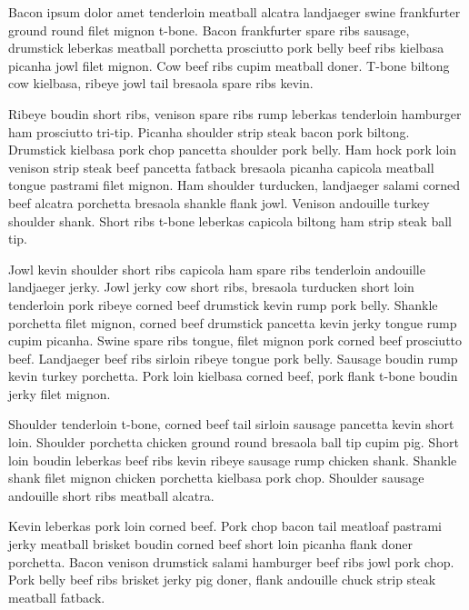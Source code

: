 \documentclass[11pt, a4paper]{article} %
\begin{document}
%	

Bacon ipsum dolor amet tenderloin meatball alcatra landjaeger swine frankfurter ground round filet mignon t-bone. Bacon frankfurter spare ribs sausage, drumstick leberkas meatball porchetta prosciutto pork belly beef ribs kielbasa picanha jowl filet mignon. Cow beef ribs cupim meatball doner. T-bone biltong cow kielbasa, ribeye jowl tail bresaola spare ribs kevin.

Ribeye boudin short ribs, venison spare ribs rump leberkas tenderloin hamburger ham prosciutto tri-tip. Picanha shoulder strip steak bacon pork biltong. Drumstick kielbasa pork chop pancetta shoulder pork belly. Ham hock pork loin venison strip steak beef pancetta fatback bresaola picanha capicola meatball tongue pastrami filet mignon. Ham shoulder turducken, landjaeger salami corned beef alcatra porchetta bresaola shankle flank jowl. Venison andouille turkey shoulder shank. Short ribs t-bone leberkas capicola biltong ham strip steak ball tip.

Jowl kevin shoulder short ribs capicola ham spare ribs tenderloin andouille landjaeger jerky. Jowl jerky cow short ribs, bresaola turducken short loin tenderloin pork ribeye corned beef drumstick kevin rump pork belly. Shankle porchetta filet mignon, corned beef drumstick pancetta kevin jerky tongue rump cupim picanha. Swine spare ribs tongue, filet mignon pork corned beef prosciutto beef. Landjaeger beef ribs sirloin ribeye tongue pork belly. Sausage boudin rump kevin turkey porchetta. Pork loin kielbasa corned beef, pork flank t-bone boudin jerky filet mignon.

Shoulder tenderloin t-bone, corned beef tail sirloin sausage pancetta kevin short loin. Shoulder porchetta chicken ground round bresaola ball tip cupim pig. Short loin boudin leberkas beef ribs kevin ribeye sausage rump chicken shank. Shankle shank filet mignon chicken porchetta kielbasa pork chop. Shoulder sausage andouille short ribs meatball alcatra.

Kevin leberkas pork loin corned beef. Pork chop bacon tail meatloaf pastrami jerky meatball brisket boudin corned beef short loin picanha flank doner porchetta. Bacon venison drumstick salami hamburger beef ribs jowl pork chop. Pork belly beef ribs brisket jerky pig doner, flank andouille chuck strip steak meatball fatback.

\twocolumn 
\end{document}
